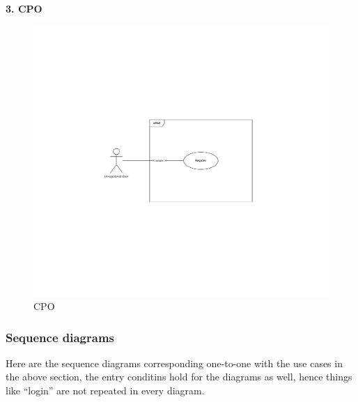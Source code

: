 \documentclass[11pt]{article}
\begin{document}
\begin{description}
    \item \textbf{3. CPO}
    \begin{figure}[!ht]
        \centering
        \includegraphics[page={3}, trim=6.6cm 4cm 6.6cm 8.8cm, width=0.8\linewidth, clip]{UseCases.pdf}
        \caption{CPO}
    \end{figure}
\end{description}

\newpage

\subsubsection{Sequence diagrams}

Here are the sequence diagrams corresponding one-to-one with the use cases in the above section, the entry conditins hold for the diagrams as well, hence things like “login” are not repeated in every diagram.
\end{document}
